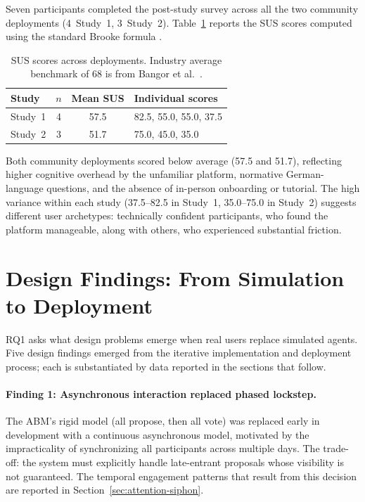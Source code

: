 \documentclass[a4paper, 12pt, twoside]{iviathesis}
\begin{document}
Seven participants completed the post-study survey across all the two community deployments (4~Study~1, 3~Study~2). Table~\ref{tab:sus} reports the SUS scores computed using the standard Brooke formula \cite{brooke1996sus}.

\begin{table}[htbp]
\centering
\caption{SUS scores across deployments. Industry average benchmark of 68 is from Bangor et al.\ \cite{bangor2008empirical}.}
\label{tab:sus}
\begin{tabular}{lccl}
\toprule
Study & $n$ & Mean SUS & Individual scores \\
\midrule
Study~1 & 4 & 57.5 & 82.5, 55.0, 55.0, 37.5 \\
Study~2 & 3 & 51.7 & 75.0, 45.0, 35.0 \\
\bottomrule
\end{tabular}
\end{table}

Both community deployments scored below average (57.5 and 51.7), reflecting higher cognitive overhead by the unfamiliar platform, normative German-language questions, and the absence of in-person onboarding or tutorial. The high variance within each study (37.5--82.5 in Study~1, 35.0--75.0 in Study~2) suggests different user archetypes: technically confident participants, who found the platform manageable, along with others, who experienced substantial friction.

\section{Design Findings: From Simulation to Deployment}
\label{sec:design-findings}

RQ1 asks what design problems emerge when real users replace simulated agents. Five design findings emerged from the iterative implementation and deployment process; each is substantiated by data reported in the sections that follow.

\paragraph{Finding 1: Asynchronous interaction replaced phased lockstep.}
The ABM's rigid model (all propose, then all vote) was replaced early in development with a continuous asynchronous model, motivated by the impracticality of synchronizing all participants across multiple days. The trade-off: the system must explicitly handle late-entrant proposals whose visibility is not guaranteed. The temporal engagement patterns that result from this decision are reported in Section~\ref{sec:attention-siphon}.
\end{document}
